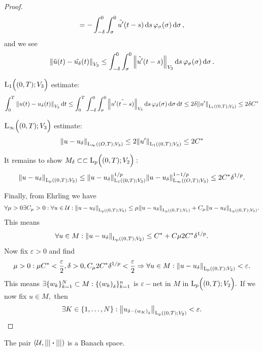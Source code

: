 \documentclass{article}
\begin{document}
\begin{proof}
	\[
		= - \int_{-\delta}^0 \int_{\sigma}^0 \tilde{u'}\qty(t-s)\dd{s}\varphi_{\sigma}\qty(\sigma)\dd{\sigma},
	\]
	and we see
	\[
		\norm{\tilde{u}(t)-\tilde{u_{\delta}}(t)}_{V_3} \leq \int_{-\delta}^0 \int_{\sigma}^0 \norm{\tilde{u'}\qty(t-s)}_{V_3}\dd{s}\varphi_{\sigma}\qty(\sigma)\dd{\sigma}.
	\]


	$\text{L}_{\text{1}}\!\,\Bigl( (0,T);V_3 \Bigr)$ estimate:
	\[
		\int_{0}^T \norm{u(t)-u_{\delta}(t)}_{V_3}\dd{t} \leq \int_{0}^T \int_{-\delta}^0 \int_{\sigma}^0 \norm{\tilde{u'(t-s)}}_{V_3}\dd{s}\varphi_{\delta}\qty(\sigma)\dd{\sigma}\dd{t} \leq 2 \delta \norm{u'}_{\text{L}_{\text{1}}\!\,\left( (0,T);V_3 \right)} \leq 2 \delta C^{*}
	\]


	$\text{L}_{\infty}\!\,\Bigl( (0,T);V_3 \Bigr)$ estimate:
	\[
		\norm{u-u_{\delta}}_{\text{L}_{\infty}\!\,\left( (O,T);V_3 \right)}\leq 2 \norm{u'}_{\text{L}_{\text{1}}\!\,\left( (0,T);V_3 \right)} \leq 2 C^{*}
	\]


	It remains to show $M_{\delta} \subset \subset \text{L}_{\text{p}}\!\,\Bigl( (0,T);V_2 \Bigr):$
	\[
		\norm{u-u_{\delta}}_{\text{L}_{\text{p}}\!\,\left( (0,T);V_3 \right)}\leq \norm{u-u_{\delta}}_{\text{L}_{\text{1}}\!\,\left( (0,T);V_3 \right)}^{1/p} \norm{u-u_{\delta}}_{\text{L}_{\infty}\!\,\left( (O,T);V_3 \right)}^{1-1/p} \leq 2 C^{*} \delta^{1/p}.
	\]

	Finally, from Ehrling we have
	\[
		\forall \mu >0 \exists C_{\mu}>0: \forall u \in \mathcal{U}: \norm{u-u_{\delta}}_{\text{L}_{\text{p}}\!\,\left( (0,T);V_2 \right)}\leq \mu \norm{u-u_{\delta}}_{\text{L}_{\text{p}}\!\,\left( (0,T);V_1 \right)}+ C_{\mu}\norm{u-u_{\delta}}_{\text{L}_{\text{p}}\!\,\left( (0,T);V_3 \right)}.
	\]
	This means
	\[
		\forall u \in M: \norm{u-u_{\delta}}_{\text{L}_{\text{p}}\!\,\left( (0,T);V_2 \right)}\leq C^{*} + C \mu 2 C^{*} \delta^{1/p}.
	\]
	Now fix $\varepsilon > 0$ and find
	\[
		\mu >0: \mu C^{*} < \frac{\varepsilon}{2}, \delta >0, C_{\mu}2 C^{*} \delta^{1/p} < \frac{\varepsilon}{2} \Rightarrow \forall u \in M: \norm{u-u_{\delta}}_{\text{L}_{\text{p}}\!\,\left( (0,T);V_2 \right)}< \varepsilon.
	\]
	This means $\exists \{ w_k \}_{k=1}^N \subset M: \{\qty(w_k)_{\delta}\}_{k=1}^n	$ is $\varepsilon-$net in $M$ in $\text{L}_{\text{p}}\!\,\Bigl( (0,T);V_2 \Bigr).$ If we now fix $u \in M,$ then
	\[
		\exists K \in \{1, \dots, N\}: \norm{u_{\delta-\qty(w_K)_{\delta}}}_{\text{L}_{\text{p}}\!\,\left( (0,T);V_2 \right)} < \varepsilon.
	\]
\end{proof}
\begin{remark}
	The pair $\qty(\mathcal{U}, |||\vdot|||)$ is a Banach space.
\end{remark}
\end{document}
